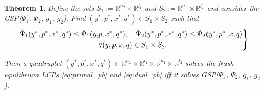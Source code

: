 \documentclass{article} %
\newtheorem{theorem}{Theorem} \newtheorem{lemma}[theorem]{Lemma}
\begin{document}
\begin{theorem}
Define the sets $S_1 := \mathbb{R}^{n_2}_+ \times \mathbb{R}^{l_1}$ and $S_2 :=
\mathbb{R}^{n_1}_+ \times \mathbb{R}^{l_2}$ and consider the
GSP($\Psi_1$, $\Psi_2$, $g_1$, $g_2$): Find $(y^*,p^*, x^*, q^*) \in
S_1 \times S_2$ such that
\begin{eqnarray}
  \left.
  \begin{aligned}
    \hat{\Psi}_1(y^*, p^*, x^*, q^*) \le \hat{\Psi}_1(y, &p, x^*,
    q^*),\hspace{.5em} \hspace{.5em}\hat{\Psi}_2(y^*, p^*, x^*, q^*)
    \le \hat{\Psi}_2(y^*, p^*, x, q)\\
    &\forall (y,p, x, q) \in S_1 \times S_2.
  \end{aligned}
  \right\}
  \label{eq:unconstrained_pb}
\end{eqnarray}
\label{thm:pd}

Then a quadruplet $(y^*,p^*, x^*, q^*) \in \mathbb{R}^{n_2}
  \times \mathbb{R}^{l_1} \times \mathbb{R}^{n_1} \times
  \mathbb{R}^{l_2}$ solves the Nash equilibrium LCPs
  \eqref{eq:primal_pb} and \eqref{eq:dual_pb} iff it solves
  GSP($\Psi_1$, $\Psi_2$, $g_1$, $g_2$).
  \label{thm:pd}
\end{theorem}
\end{document}
